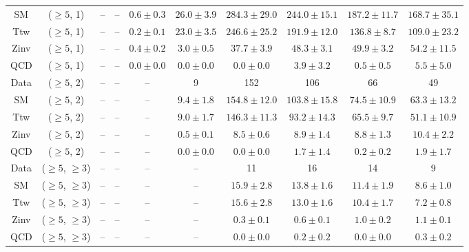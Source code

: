 \begin{table}[h!]
{\begin{tabular}{cccccccccc}
	SM & ($\ge5$, 1) & -- & -- & $0.6\pm 0.3$ & $26.0\pm 3.9$ & $284.3\pm 29.0$ & $244.0\pm 15.1$ & $187.2\pm 11.7$ & $168.7\pm 35.1$ \\[0.5ex] 
	Ttw & ($\ge5$, 1) & -- & -- & $0.2\pm 0.1$ & $23.0\pm 3.5$ & $246.6\pm 25.2$ & $191.9\pm 12.0$ & $136.8\pm 8.7$ & $109.0\pm 23.2$ \\[0.5ex] 
	Zinv & ($\ge5$, 1) & -- & -- & $0.4\pm 0.2$ & $3.0\pm 0.5$ & $37.7\pm 3.9$ & $48.3\pm 3.1$ & $49.9\pm 3.2$ & $54.2\pm 11.5$ \\[0.5ex] 
	QCD & ($\ge5$, 1) & -- & -- & $0.0\pm 0.0$ & $0.0\pm 0.0$ & $0.0\pm 0.0$ & $3.9\pm 3.2$ & $0.5\pm 0.5$ & $5.5\pm 5.0$ \\[0.5ex] 
	Data & ($\ge5$, 2) & -- & -- & -- & 9 & 152 & 106 & 66 & 49 \\[0.5ex] 
	SM & ($\ge5$, 2) & -- & -- & -- & $9.4\pm 1.8$ & $154.8\pm 12.0$ & $103.8\pm 15.8$ & $74.5\pm 10.9$ & $63.3\pm 13.2$ \\[0.5ex] 
	Ttw & ($\ge5$, 2) & -- & -- & -- & $9.0\pm 1.7$ & $146.3\pm 11.3$ & $93.2\pm 14.3$ & $65.5\pm 9.7$ & $51.1\pm 10.9$ \\[0.5ex] 
	Zinv & ($\ge5$, 2) & -- & -- & -- & $0.5\pm 0.1$ & $8.5\pm 0.6$ & $8.9\pm 1.4$ & $8.8\pm 1.3$ & $10.4\pm 2.2$ \\[0.5ex] 
	QCD & ($\ge5$, 2) & -- & -- & -- & $0.0\pm 0.0$ & $0.0\pm 0.0$ & $1.7\pm 1.4$ & $0.2\pm 0.2$ & $1.9\pm 1.7$ \\[0.5ex] 
	Data & ($\ge5$, $\ge3$) & -- & -- & -- & -- & 11 & 16 & 14 & 9 \\[0.5ex] 
	SM & ($\ge5$, $\ge3$) & -- & -- & -- & -- & $15.9\pm 2.8$ & $13.8\pm 1.6$ & $11.4\pm 1.9$ & $8.6\pm 1.0$ \\[0.5ex] 
	Ttw & ($\ge5$, $\ge3$) & -- & -- & -- & -- & $15.6\pm 2.8$ & $13.0\pm 1.6$ & $10.4\pm 1.7$ & $7.2\pm 0.8$ \\[0.5ex] 
	Zinv & ($\ge5$, $\ge3$) & -- & -- & -- & -- & $0.3\pm 0.1$ & $0.6\pm 0.1$ & $1.0\pm 0.2$ & $1.1\pm 0.1$ \\[0.5ex] 
	QCD & ($\ge5$, $\ge3$) & -- & -- & -- & -- & $0.0\pm 0.0$ & $0.2\pm 0.2$ & $0.0\pm 0.0$ & $0.3\pm 0.2$ \\[0.5ex] 
	\hline
	\hline
\end{tabular}}
\end{table}
